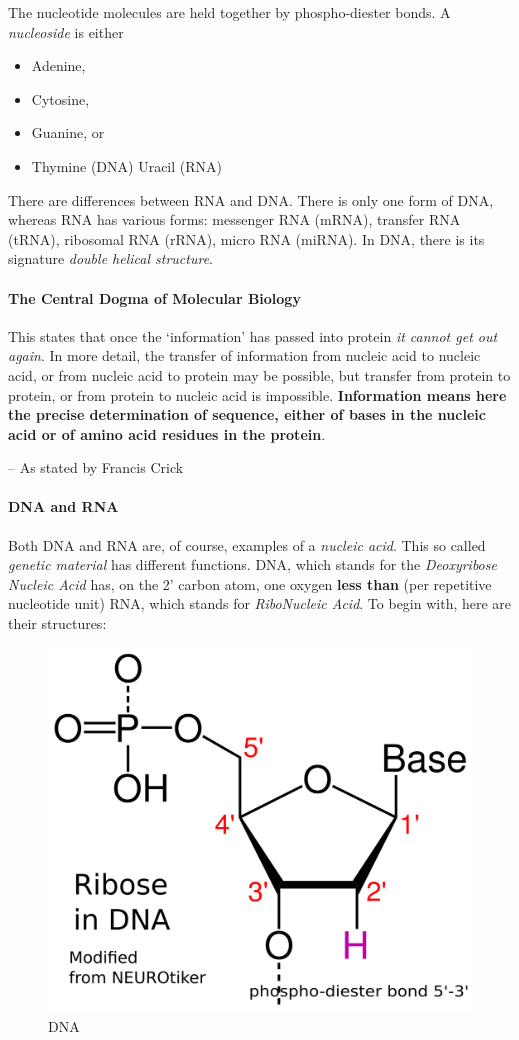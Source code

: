 \documentclass[12pt]{article}
\begin{document}
The nucleotide molecules are held together by phospho-diester bonds. A \emph{nucleoside} is either
\begin{itemize}
    \item Adenine,
    \item Cytosine,
    \item Guanine, or
    \item Thymine (DNA) Uracil (RNA)
\end{itemize}

There are differences between RNA and DNA. There is only one form of DNA, whereas RNA has various forms: messenger RNA (mRNA), transfer RNA (tRNA), ribosomal RNA (rRNA), micro RNA (miRNA). In DNA, there is its signature \emph{double helical structure}. 


\paragraph{The Central Dogma of Molecular Biology}
\epigraph
{
    This states that once the `information' has passed into protein \textit{it cannot get out again}. In more detail, the transfer of information from nucleic acid to nucleic acid, or from nucleic acid to protein may be possible, but transfer from protein to protein, or from protein to nucleic acid is impossible. \textbf{Information means here the precise determination of sequence, either of bases in the nucleic acid or of amino acid residues in the protein}.
}
{
    -- As stated by Francis Crick \cite{the-central-dogma}
}

\paragraph{DNA and RNA}
Both DNA and RNA are, of course, examples of a \emph{nucleic acid}. This so called \emph{genetic material} has different functions. DNA, which stands for the \emph{Deoxyribose Nucleic Acid} has, on the 2' carbon atom, one oxygen \textbf{less than} (per repetitive nucleotide unit) RNA, which stands for \emph{RiboNucleic Acid}. To begin with, here are their structures:

\begin{figure}[ht!]
    \centering
    \includegraphics[width=0.5\linewidth]{dna-ribose-numbering-std-notation.png}
    \caption{DNA}
    \label{fig: dna}
\end{figure}
\end{document}
